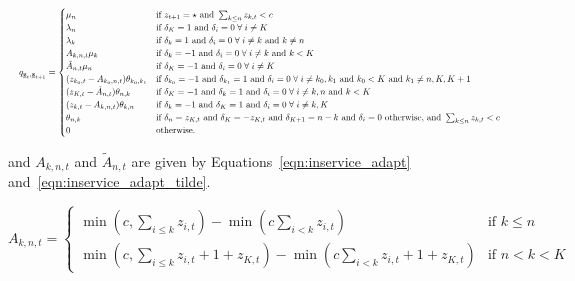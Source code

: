 \documentclass{article}
\begin{document}
\begin{equation}\label{eqn:transitions_sojourn}
\resizebox{\textwidth}{!}{%
$q_{\underline{\mathbf{z}}_t, \underline{\mathbf{z}}_{t+1}} = 
\begin{cases}
\mu_n & \text{if } z_{t+1} = \star \text{ and } \sum_{k \leq n} z_{k, t} < c \\
\lambda_n & \text{if } \delta_K = 1 \text{ and } \delta_i = 0 \; \forall \; i \neq K \\
\lambda_k & \text{if } \delta_k = 1 \text{ and } \delta_i = 0 \; \forall \; i \neq k \text{ and } k \neq n\\
A_{k,n,t} \mu_k & \text{if } \delta_k = -1 \text{ and } \delta_i = 0 \; \forall \; i \neq k \text{ and } k < K\\
\tilde{A}_{n,t} \mu_n & \text{if } \delta_K = -1 \text{ and } \delta_i = 0 \; \forall \; i \neq K\\
(z_{k_0,t} - A_{k_0,n,t}) \theta_{k_0,k_1} & \text{if } \delta_{k_0} = -1 \text{ and } \delta_{k_1} = 1 \text{ and } \delta_i = 0 \; \forall \; i \neq k_0, k_1 \text{ and } k_0 < K \text{ and } k_1 \neq n, K, K+1 \\
(z_{K,t} - \tilde{A}_{n,t}) \theta_{n,k} & \text{if } \delta_K = -1 \text{ and } \delta_{k} = 1 \text{ and } \delta_i = 0 \; \forall \; i \neq k, n \text{ and } k < K \\
(z_{k,t} - A_{k,n,t}) \theta_{k,n} & \text{if } \delta_k = -1 \text{ and } \delta_K = 1 \text{ and } \delta_i = 0 \; \forall \; i \neq k, K \\
\theta_{n, k} & \text{if } \delta_n = z_{K,t} \text{ and } \delta_K = -z_{K,t} \text{ and } \delta_{K+1} = n - k \text{ and } \delta_i = 0 \text{ otherwise, and } \sum_{k \leq n} z_{k, t} < c \\
0 & \text{otherwise.}
\end{cases}$%
}
\end{equation}

and $A_{k,n,t}$ and $\tilde{A}_{n, t}$ are given by
Equations~\ref{eqn:inservice_adapt} and~\ref{eqn:inservice_adapt_tilde}.

\begin{equation}\label{eqn:inservice_adapt}
A_{k,n,t} =
\begin{cases}
\min\left(c, \sum_{i \leq k} z_{i,t}\right) - \min\left(c \sum_{i < k} z_{i,t}\right) & \text{if } k \leq n \\
\min\left(c, \sum_{i \leq k} z_{i,t} + 1 + z_{K,t}\right) - \min\left(c \sum_{i < k} z_{i,t} + 1 + z_{K,t}\right) & \text{if } n < k < K
\end{cases}
\end{equation}
\end{document}
